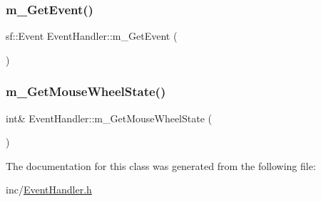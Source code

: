 \mbox{\label{class_event_handler_a829677a604aaea61fc54cf4089e71f7e}} 
\subsubsection{\texorpdfstring{m\+\_\+\+Get\+Event()}{m\_GetEvent()}}
{\footnotesize\ttfamily sf\+::\+Event Event\+Handler\+::m\+\_\+\+Get\+Event (\begin{DoxyParamCaption}{ }\end{DoxyParamCaption})}

\mbox{\label{class_event_handler_accb8a32ae3f165b2ac42d313df0e9425}} 
\subsubsection{\texorpdfstring{m\+\_\+\+Get\+Mouse\+Wheel\+State()}{m\_GetMouseWheelState()}}
{\footnotesize\ttfamily int\& Event\+Handler\+::m\+\_\+\+Get\+Mouse\+Wheel\+State (\begin{DoxyParamCaption}{ }\end{DoxyParamCaption})}



The documentation for this class was generated from the following file\+:\begin{DoxyCompactItemize}
\item 
inc/\mbox{\hyperlink{_event_handler_8h}{Event\+Handler.\+h}}\end{DoxyCompactItemize}
